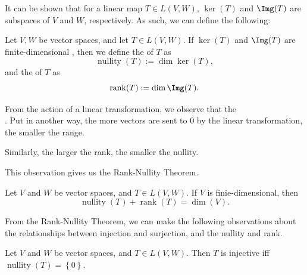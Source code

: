 \documentclass[notoc,notitlepage]{tufte-book}
\DeclareMathOperator{\nullity}{nullity}
\DeclareMathOperator{\rank}{rank}
\begin{document}
It can be shown that for a linear map $T \in L(V, W)$,
$\ker (T)$ and $\Img(T)$ are subspaces of $V$ and $W$, respectively.
As such, we can define the following:

\begin{defn}\label{defn:rank_and_nullity}
  Let $V, W$ be vector spaces, and let $T \in L(V, W)$.
  If $\ker(T)$ and $\Img(T)$ are finite-dimensional
  ,
  then we define the  of $T$ as
  \begin{equation*}
    \nullity(T) := \dim \ker (T),
  \end{equation*}
  and the  of $T$ as
  \begin{equation*}
    \rank(T) := \dim \Img(T).
  \end{equation*}
\end{defn}

\begin{note}
  From the action of a linear transformation, we observe that the \\
  \noindent
  .
  Put in another way, the more vectors are sent to $0$ by the linear transformation,
  the smaller the range.

  Similarly, the larger the rank, the smaller the nullity.
\end{note}

This observation gives us the Rank-Nullity Theorem.

\begin{thm}\label{thm:rank_nullity_theorem}
  Let $V$ and $W$ be vector spaces, and $T \in L(V, W)$. If $V$ is finie-dimensional, then
  \begin{equation*}
    \nullity(T) + \rank(T) = \dim (V).
  \end{equation*}
\end{thm}

From the Rank-Nullity Theorem,
we can make the following observations about the relationships
between injection and surjection, and the nullity and rank.

\begin{propo}\label{propo:nullity_of_only_0_and_injectivity}
  Let $V$ and $W$ be vector spaces, and $T \in L(V, W)$.
  Then $T$ is injective iff $\nullity(T) = \left\{ 0 \right\}$.
\end{propo}
\end{document}
